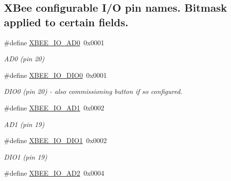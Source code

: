 \subsection*{X\+Bee configurable I/O pin names. Bitmask applied to certain fields.}
\begin{DoxyCompactItemize}
\item 
\mbox{\label{group__xbee__io_gafc56816e62b0dd0a8d981b08f5f29651}} 
\#define \hyperlink{group__xbee__io_gafc56816e62b0dd0a8d981b08f5f29651}{X\+B\+E\+E\+\_\+\+I\+O\+\_\+\+A\+D0}~0x0001
\begin{DoxyCompactList}\small\item\em A\+D0 (pin 20) \end{DoxyCompactList}\item 
\mbox{\label{group__xbee__io_gaf01ab2d51afb8e360ade1ec5ceb15f0c}} 
\#define \hyperlink{group__xbee__io_gaf01ab2d51afb8e360ade1ec5ceb15f0c}{X\+B\+E\+E\+\_\+\+I\+O\+\_\+\+D\+I\+O0}~0x0001
\begin{DoxyCompactList}\small\item\em D\+I\+O0 (pin 20) -\/ also commissioning button if so configured. \end{DoxyCompactList}\item 
\mbox{\label{group__xbee__io_ga78db08538e469fbe09b17180b74f3e1c}} 
\#define \hyperlink{group__xbee__io_ga78db08538e469fbe09b17180b74f3e1c}{X\+B\+E\+E\+\_\+\+I\+O\+\_\+\+A\+D1}~0x0002
\begin{DoxyCompactList}\small\item\em A\+D1 (pin 19) \end{DoxyCompactList}\item 
\mbox{\label{group__xbee__io_gaf13c9ac98667d02de7b5ab0428b20dc2}} 
\#define \hyperlink{group__xbee__io_gaf13c9ac98667d02de7b5ab0428b20dc2}{X\+B\+E\+E\+\_\+\+I\+O\+\_\+\+D\+I\+O1}~0x0002
\begin{DoxyCompactList}\small\item\em D\+I\+O1 (pin 19) \end{DoxyCompactList}\item 
\mbox{\label{group__xbee__io_ga03c92ebb88533c632409a6d869b7d063}} 
\#define \hyperlink{group__xbee__io_ga03c92ebb88533c632409a6d869b7d063}{X\+B\+E\+E\+\_\+\+I\+O\+\_\+\+A\+D2}~0x0004

\end{DoxyCompactItemize}
